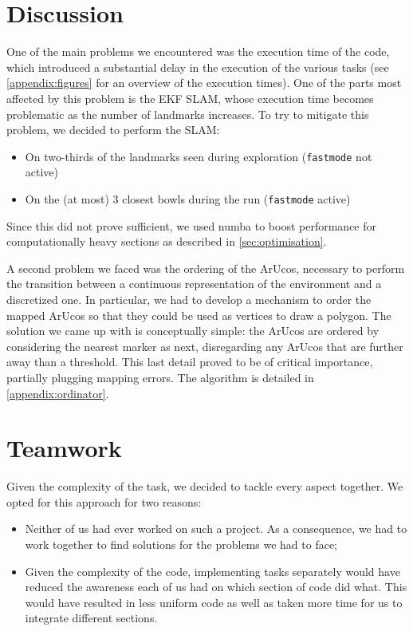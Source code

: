 \documentclass[
	12pt,
]{sty/report_style}
\begin{document}
\section{Discussion}


One of the main problems we encountered was the execution time of the code, which introduced a substantial delay in the execution of the various tasks (see \cref{appendix:figures} for an overview of the execution times). One of the parts most affected by this problem is the EKF SLAM, whose execution time becomes problematic as the number of landmarks increases. To try to mitigate this problem, we decided to perform the SLAM:
\begin{itemize}
    \item On two-thirds of the landmarks seen during exploration (\verb|fastmode| not active)
    \item On the (at most) 3 closest bowls during the run (\verb|fastmode| active)
\end{itemize}

Since this did not prove sufficient, we used numba to boost performance for computationally heavy sections as described in \cref{sec:optimisation}.

A second problem we faced was the ordering of the ArUcos, necessary to perform the  transition between a continuous representation of the environment and a discretized one. In particular, we had to develop a mechanism to order the mapped ArUcos so that they could be used as vertices to draw a polygon. The solution we came up with is conceptually simple: the ArUcos are ordered by considering the nearest marker as next, disregarding any ArUcos that are further away than a threshold. This last detail proved to be of critical importance, partially plugging mapping errors. The algorithm is detailed in \cref{appendix:ordinator}.


\section{Teamwork}

Given the complexity of the task, we decided to tackle every aspect together. We opted for this approach for two reasons:
\begin{itemize}
    \item Neither of us had ever worked on such a project. As a consequence, we had to work together to find solutions for the problems we had to face;
    \item Given the complexity of the code, implementing tasks separately would have reduced the awareness each of us had on which section of code did what. This would have resulted in less uniform code as well as taken more time for us to integrate different sections.
\end{itemize}
\end{document}
